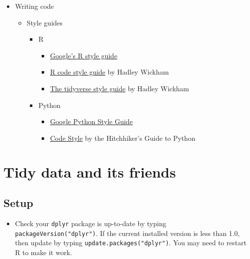 \documentclass[
]{book}
\providecommand{\tightlist}{%
  \setlength{\itemsep}{0pt}\setlength{\parskip}{0pt}}
\begin{document}
\begin{itemize}
\item
  Writing code

  \begin{itemize}
  \tightlist
  \item
    Style guides

    \begin{itemize}
    \tightlist
    \item
      R

      \begin{itemize}
      \tightlist
      \item
        \href{https://google.GitHub.io/styleguide/Rguide.xml}{Google's R style guide}
      \item
        \href{http://r-pkgs.had.co.nz/r.html}{R code style guide} by Hadley Wickham
      \item
        \href{http://style.tidyverse.org/}{The tidyverse style guide} by Hadley Wickham
      \end{itemize}
    \item
      Python

      \begin{itemize}
      \tightlist
      \item
        \href{https://GitHub.com/google/styleguide/blob/gh-pages/pyguide.md}{Google Python Style Guide}
      \item
        \href{https://docs.python-guide.org/writing/style/\#zen-of-python}{Code Style} by the Hitchhiker's Guide to Python
      \end{itemize}
    \end{itemize}
  \end{itemize}
\end{itemize}

\chapter{Tidy data and its friends}\label{tidy_data}

\section{Setup}\label{setup-2}

\begin{itemize}
\tightlist
\item
  Check your \texttt{dplyr} package is up-to-date by typing \texttt{packageVersion("dplyr")}. If the current installed version is less than 1.0, then update by typing \texttt{update.packages("dplyr")}. You may need to restart R to make it work.
\end{itemize}
\end{document}
